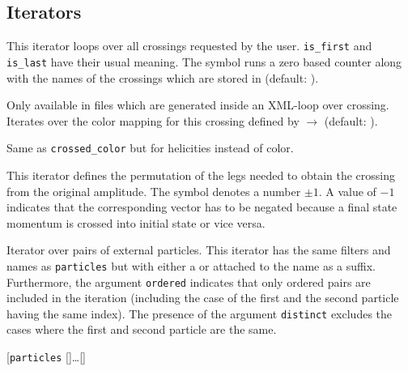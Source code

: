 \documentclass[11pt,a4paper]{refrep}
\begin{document}
\subsection{Iterators}
\begin{description}
\item[\texttt{crossings}
    {[\texttt{index=}]} {[\texttt{var=}]}]
   This iterator loops over all crossings requested
   by the user. \texttt{is\_first} and \texttt{is\_last} have their usual
   meaning. The symbol  runs a zero based counter along with
   the names of the crossings which are stored in 
   (default: \lit{\$\_}).
\item[\texttt{crossed\_color}
    {[\texttt{initial}]} {[\texttt{final}]}
    {[\texttt{index=}]} {[\texttt{var=}]}]
   Only available in files which are
   generated inside an XML-loop over crossing.
   Iterates over the color mapping for this crossing defined by
    $\to$  (default: \lit{\$\_}).
\item[\texttt{crossed\_helicities}
    {[\texttt{initial}]} {[\texttt{final}]}
    {[\texttt{index=}]} {[\texttt{var=}]}]
    Same as \texttt{crossed\_color}
    but for helicities instead of color.
\item[\texttt{crossing}
    {[\texttt{sign=}]}
    {[\texttt{index=}]} {[\texttt{var=}]}]
    This iterator defines the permutation of the legs needed to obtain
    the crossing from the original amplitude. The symbol 
    denotes a number $\pm1$. A value of $-1$ indicates that the corresponding
    vector has to be negated because a final state momentum is crossed into
    initial state or vice versa.
\item[\texttt{pairs}
   {[\texttt{ordered}]} {[\texttt{distinct}]} \ldots] Iterator over
   pairs of external particles. This iterator has the same filters and
   names as \texttt{particles} but with either a  or  attached
   to the name as a suffix. Furthermore, the argument \texttt{ordered}
   indicates that only ordered pairs are included in the iteration
   (including the case of the first and the second particle having the same
   index). The presence of the argument \texttt{distinct} excludes the
   cases where the first and second particle are the same.
\item[\texttt{particles}
   {[]}\dots {[]}

\end{description}
\end{document}
